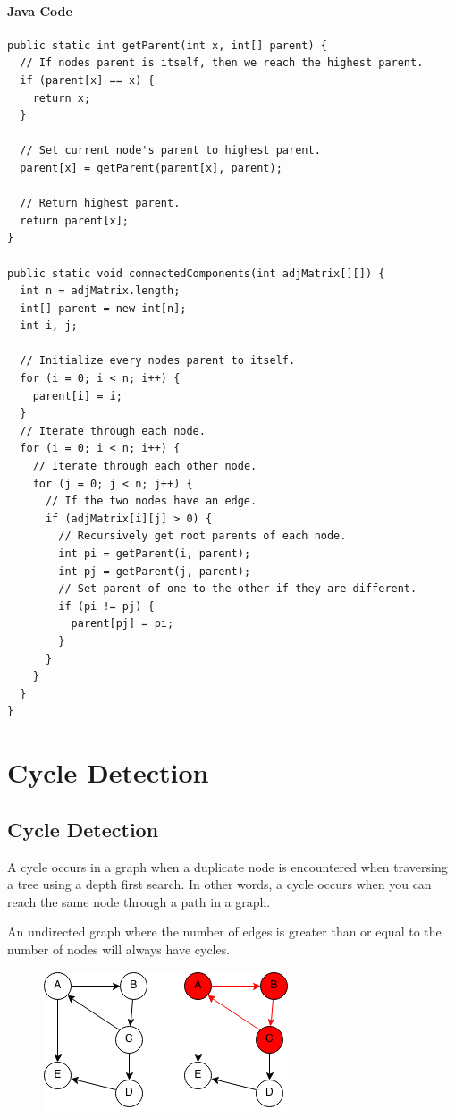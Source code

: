 \documentclass[11pt,oneside]{book}
\makeatletter
\def\maxwidth#1{\ifdim\Gin@nat@width>#1 #1\else\Gin@nat@width\fi}
\makeatother
\begin{document}
\subsubsection{Java Code}

\begin{lstlisting}
public static int getParent(int x, int[] parent) {
  // If nodes parent is itself, then we reach the highest parent.
  if (parent[x] == x) {
    return x;
  }

  // Set current node's parent to highest parent.
  parent[x] = getParent(parent[x], parent);

  // Return highest parent.
  return parent[x];
}

public static void connectedComponents(int adjMatrix[][]) {
  int n = adjMatrix.length;
  int[] parent = new int[n];
  int i, j;

  // Initialize every nodes parent to itself.
  for (i = 0; i < n; i++) {
    parent[i] = i;
  }
  // Iterate through each node.
  for (i = 0; i < n; i++) {
    // Iterate through each other node.
    for (j = 0; j < n; j++) {
      // If the two nodes have an edge.
      if (adjMatrix[i][j] > 0) {
        // Recursively get root parents of each node.
        int pi = getParent(i, parent);
        int pj = getParent(j, parent);
        // Set parent of one to the other if they are different.
        if (pi != pj) {
          parent[pj] = pi;
        }
      }
    }
  }
}
\end{lstlisting}

    \chapter{ Cycle Detection }
        \section{ Cycle Detection }
        

A cycle occurs in a graph when a duplicate node is encountered when traversing a tree using a depth first search. In other words, a cycle occurs when you can reach the same node through a path in a graph.

An undirected graph where the number of edges is greater than or equal to the number of nodes will always have cycles.

\vspace{5px}\begin{figure}[H]\centering
        \includegraphics[width=0.66\maxwidth{\textwidth}]{cycle2.png}
        \end{figure}
\end{document}
